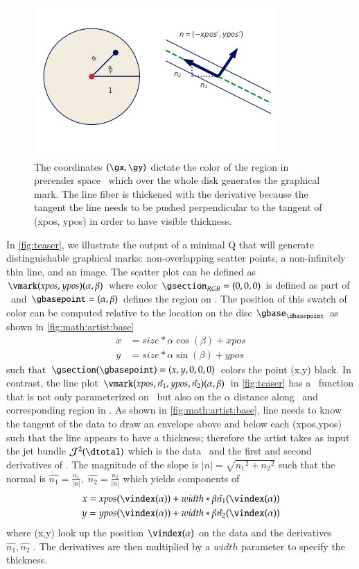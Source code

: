 \documentclass[journal]{vgtc}                %
\begin{document}
\begin{figure}
  \centering
  \includegraphics[width=.5\columnwidth]{base_q}
  \caption{The coordinates $(\gx, \gy)$ dictate the color of the region in prerender space \gbase\, which over the whole disk generates the graphical mark. The line fiber is thickened with the derivative because the tangent the line needs to be pushed perpendicular to the tangent of (xpos, ypos) in order to have visible thickness.}
  \label{fig:math:artist:base}
\end{figure}

In \autoref{fig:teaser}, we illustrate the output of a minimal Q that will generate distinguishable graphical marks: non-overlapping scatter points, a non-infinitely thin line, and an image. The scatter plot can be defined as $\vmark(xpos, ypos)(\alpha, \beta)$ where color $\gsection_{RGB} = (0,0,0)$ is defined as part of \vmark\ and $\gbasepoint=(\alpha, \beta)$ defines the region on \gbase. The position of this swatch of color can be computed relative to the location on the disc $\gbase_{\dbasepoint}$ as shown in \autoref{fig:math:artist:base}
\begin{align*}
x &= size *\alpha \cos(\beta) + xpos \\
y &= size *\alpha \sin(\beta) + ypos
\end{align*}
such that $\gsection(\gbasepoint) = (x, y, 0, 0, 0)$ colors the point (x,y) black. In contrast, the line plot $\vmark(xpos, \hat{n_{1}}, ypos, \hat{n_{2}})(\alpha, \beta)$ in \autoref{fig:teaser} has a \vindex\ function that is not only parameterized on \dbasepoint\ but also on the $\alpha$ distance along \dbasepoint\ and corresponding region in \gbase. As shown in \autoref{fig:math:artist:base}, line needs to know the tangent of the data to draw an envelope above and below each (xpos,ypos) such that the line appears to have a thickness; therefore the artist takes as input the jet bundle \cite{JetBundle2020,musilovaCalculusVariationsJet2016} $\mathcal{J}^{2}(\dtotal)$ which is the data \dtotal\ and the first and second derivatives of \dtotal. The magnitude of the slope is $\lvert n \rvert = \sqrt{{n_{1}}^2 + {n_{2}}^2}$
such that the normal is  $\hat{n_{1}} = \frac{n_1}{\lvert n \rvert}, \; \hat{n_{2}} = \frac{n_2}{\lvert n \rvert}$ which yields components of \gsection\
\begin{align*}
 x = xpos(\vindex(\alpha)) &+ width*\beta\hat{n_1}(\vindex(\alpha)) \\
 y = ypos(\vindex(\alpha)) &+ width*\beta\hat{n_2}(\vindex(\alpha)) 
\end{align*}
where (x,y) look up the position $\vindex(\alpha)$ on the data and the derivatives $\hat{n_1}, \hat{n_2}$ . The derivatives are then multiplied by a $width$ parameter to specify the thickness.
\end{document}

